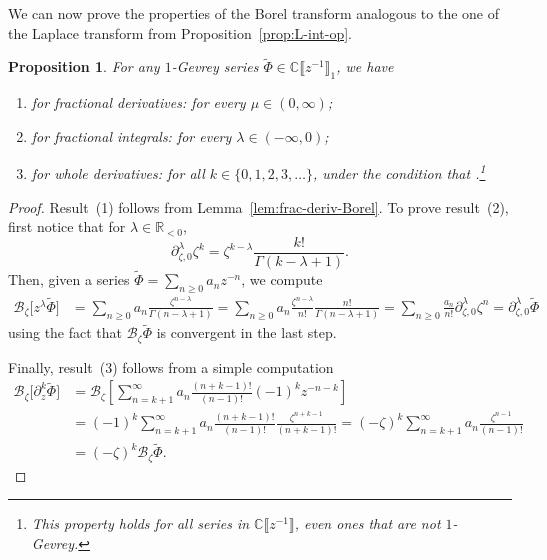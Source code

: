 \documentclass[10pt,a4paper]{amsart}
\newcommand{\R}{\mathbb{R}}
\newcommand{\C}{\mathbb{C}}
\newcommand{\series}[1]{\tilde{#1}}
\newcommand{\fracderiv}[3]{\partial^{#1}_{#2, #3}}
\newcommand{\borel}{\mathcal{B}}
\numberwithin{equation}{section}
\newtheorem{Proposition}[Theorem]{Proposition}
 { \theoremstyle{definition}
\newtheorem{Definition}[Theorem]{Definition}
\newtheorem{Remark}[Theorem]{Remark}
\newtheorem*{notation*}{Notation}
}
\begin{document}
We can now prove the properties of the Borel transform analogous to the one of the Laplace transform from Proposition~\ref{prop:L-int-op}.
\begin{Proposition}\label{prop:frac-der-int-borel}
For any $1$-Gevrey series $\series{\Phi}\in\C\big\llbracket z^{-1}\big\rrbracket_1$, we have
\begin{enumerate}[label=(\roman*)]\itemsep=0pt
\item[$(1)$] %
for fractional derivatives:
\smash{$\borel_\zeta\bigl[ z^\mu \series{\Phi}\bigr]=\fracderiv{\mu}{\zeta}{0} \borel_\zeta\series{\Phi}$} for every $\mu\in(0, \infty)$;
\item[$(2)$] %
for fractional integrals:
\smash{$\borel_\zeta\bigl[z^\lambda \series{\Phi}\bigr]=\fracderiv{\lambda}{\zeta}{0} \borel_\zeta\series{\Phi}$} for every $\lambda\in(-\infty, 0)$;
\item[$(3)$] %
for whole derivatives:
\smash{$\borel_\zeta\bigl[\partial_z^{k} \series{\Phi}\bigr]=(-\zeta)^k\borel_\zeta\series{\Phi}$} for all $k\in\{0, 1, 2, 3, \dots\}$, under the condition that \smash{$\series{\Phi}\in z^{-k-1}\big\llbracket z^{-1}\big\rrbracket_1$}.\footnote{This property holds for all series in $\C\big\llbracket z^{-1}\big\rrbracket$, even ones that are not $1$-Gevrey.}
\end{enumerate}
\end{Proposition}
\begin{proof}
Result~(1) follows from Lemma~\ref{lem:frac-deriv-Borel}.
To prove result~(2), first notice that for $\lambda \in \R_{< 0}$,
\[\fracderiv{\lambda}{\zeta}{0}\zeta^{k}=\zeta^{k-\lambda}\frac{k!}{\Gamma(k-\lambda+1)}.\]
Then, given a series $\series{\Phi} = \sum_{n\geq 0} a_n z^{-n}$, we compute
\begin{align*}
\borel_\zeta \bigl[z^\lambda \series{\Phi}\bigr] & = \sum_{n\geq 0}a_n\frac{\zeta^{n-\lambda}}{\Gamma(n-\lambda+1)} = \sum_{n\geq 0}a_n\frac{\zeta^{n-\lambda}}{n!}\frac{n!}{\Gamma(n-\lambda+1)} = \sum_{n\geq 0} \frac{a_n}{n!} \fracderiv{\lambda}{\zeta}{0}\zeta^n = \fracderiv{\lambda}{\zeta}{0}\series{\Phi}
\end{align*}
using the fact that $\borel_\zeta\series{\Phi}$ is convergent in the last step.

Finally, result~(3) follows from a simple computation
\begin{align*}
\borel_\zeta\bigl[\partial_z^k\series{\Phi}\bigr]&=\borel_\zeta\left[\sum_{n=k+1}^\infty a_n \frac{(n+k-1)!}{(n-1)!} (-1)^{k} z^{-n-k}\right]\\
&=(-1)^k \sum_{n=k+1}^\infty a_n \frac{(n+k-1)!}{(n-1)!}\frac{\zeta^{n+k-1}}{(n+k-1)!}=(-\zeta)^k\sum_{n=k+1}^\infty a_n \frac{\zeta^{n-1}}{(n-1)!}\\
&=(-\zeta)^k\borel_\zeta \series{\Phi}.\tag*{\qed}
\end{align*} \renewcommand{\qed}{}
\end{proof}
\end{document}
